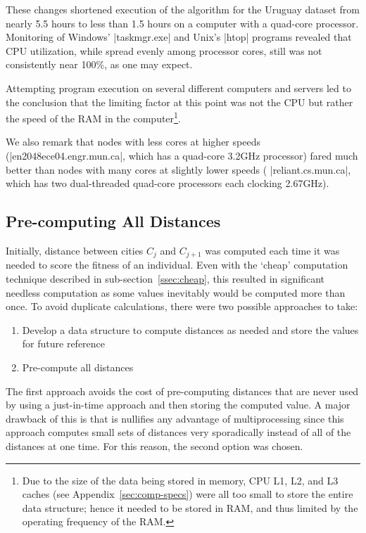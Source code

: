 These changes shortened execution of the algorithm for the Uruguay dataset
from nearly 5.5 hours to less than 1.5 hours on a computer with a quad-core
processor. Monitoring of Windows' |taskmgr.exe| and Unix's |htop| programs
revealed that CPU utilization, while spread evenly among processor cores,
still was not consistently near 100\%, as one may expect. 

Attempting program execution on several different computers and servers 
led to the conclusion that the limiting factor at this point was not the CPU 
but rather the speed of the RAM in the computer\footnote{Due to the size of
the data being stored in memory, CPU L1, L2, and L3 caches (see
Appendix~\ref{sec:comp-specs}) were all too small to store the entire 
data structure; hence it needed to be stored in RAM, and thus limited
by the operating frequency of the RAM.}. 

We also remark that nodes with less cores at higher speeds
(\ie |en2048ece04.engr.mun.ca|, which has a quad-core 3.2GHz processor) 
fared much better than nodes with many cores at slightly lower speeds (\ie 
|reliant.cs.mun.ca|, which has two dual-threaded quad-core processors 
each clocking 2.67GHz).

\subsection{Pre-computing All Distances}\label{ssec:precomputing}
Initially, distance between cities $C_j$ and $C_{j+1}$ was computed each time 
it was needed to score the fitness of an individual. Even with the `cheap' 
computation technique described in sub-section~\ref{ssec:cheap}, this resulted in
significant needless computation as some values inevitably would be 
computed more than once. To avoid duplicate calculations, there were two
possible approaches to take:
\begin{enumerate}[label={(\roman*)}]
	\item Develop a data structure to compute distances as needed and 
	store the values for future reference
	\item Pre-compute all distances
\end{enumerate}
The first approach avoids the cost of pre-computing distances that are 
never used by using a just-in-time approach and then storing the computed
value. A major drawback of this is that is nullifies any advantage of 
multiprocessing since this approach computes small sets of distances 
very sporadically instead of all of the distances at one time. For this 
reason, the second option was chosen.